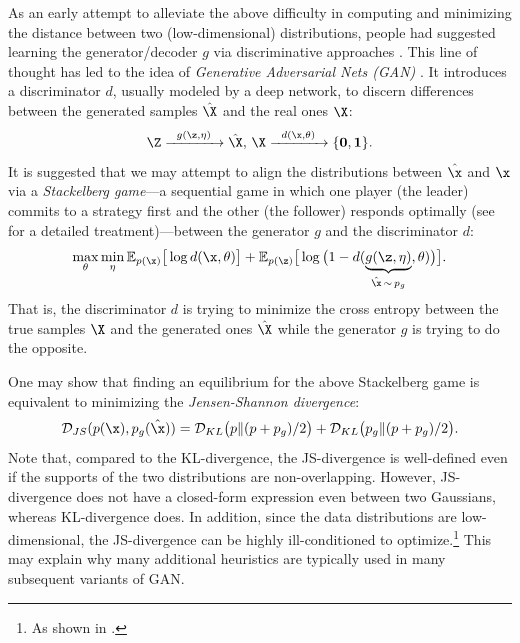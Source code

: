 \documentclass[../../book-main.tex]{subfiles}
\begin{document}
As an early attempt to alleviate the above difficulty in computing
and minimizing the distance between two (low-dimensional)
distributions, people had suggested learning the generator/decoder
$g$ via discriminative approaches \cite{Tu-2007}. This line of
thought has led to the idea of {\em Generative Adversarial Nets
(GAN)} \cite{goodfellow2014generative}. It introduces a discriminator
$d$, usually modeled by a deep network, to discern differences
between the generated samples $\hat \X$ and the real ones $\X$:
\begin{equation}
    \Z \xrightarrow{\hspace{2mm} g(\z,\eta) \hspace{2mm}} \hat \X, \,
    \X \xrightarrow{\hspace{2mm} d(\x, \theta)\hspace{2mm}} \{\mathbf
    0, \mathbf 1\}.
    \label{eqn:GAN}
\end{equation}
It is suggested that we may attempt to align the distributions
between $\hat \x$ and $\x$ via a {\em Stackelberg game}---a
sequential game in which one player (the leader) commits to a
strategy first and the other (the follower) responds optimally (see
 for a detailed treatment)---between the generator
$g$ and the discriminator $d$:
\begin{equation}
    \max_{\theta}\min_{\eta} \mathbb{E}_{p({\x})}\big[\log
    d(\x,\theta)\big] + \mathbb{E}_{p({\z})}\big[\log\big(1 -
    d(\underbrace{g(\z,\eta)}_{\hat \x \,\sim\, p_g},\theta)\big)\big].
\end{equation}
That is, the discriminator $d$ is trying to minimize the cross
entropy between the true samples $\X$ and the generated ones $\hat
\X$ while the generator $g$ is trying to do the opposite.

One may show that finding an equilibrium for the above Stackelberg
game is equivalent to minimizing the {\em Jensen-Shannon divergence}:
\begin{equation}
    \mathcal{D}_{JS}(p(\x), p_g(\hat \x)) = \mathcal{D}_{KL}\big(p \|
    (p + p_g)/{2}\big) + \mathcal{D}_{KL}\big(p_g \| (p + p_g)/{2}\big).
\end{equation}
Note that, compared to the KL-divergence, the JS-divergence is
well-defined even if the supports of the two distributions are
non-overlapping. However, JS-divergence does not have a closed-form
expression even between two Gaussians, whereas KL-divergence does. In
addition, since the data distributions are low-dimensional, the
JS-divergence can be highly ill-conditioned to optimize.\footnote{As
shown in \cite{arjovsky2017wasserstein}.} This may explain why many
additional heuristics are typically used in many subsequent variants of GAN.
\end{document}
